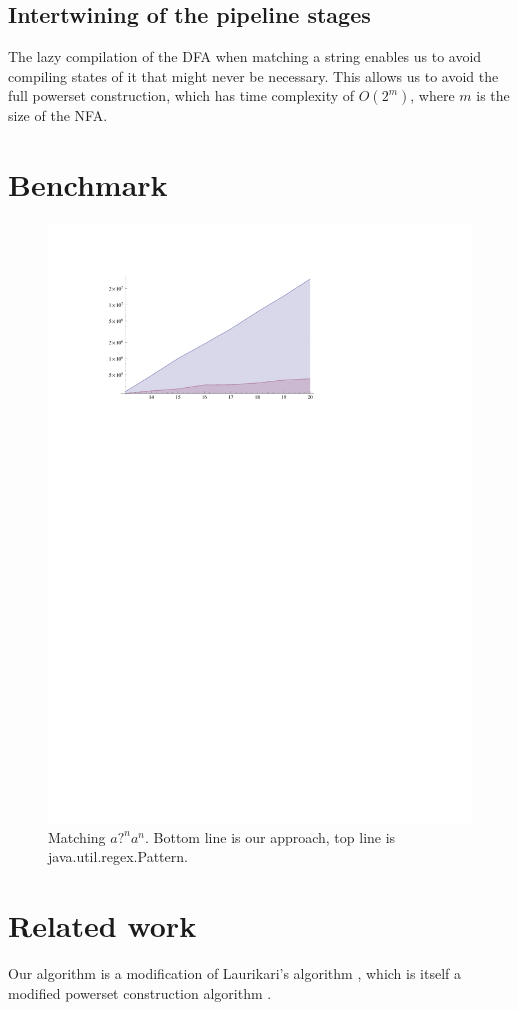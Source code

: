 \documentclass[english]{sigplanconf}
\theoremstyle{definition}
\begin{document}
\subsection{Intertwining of the pipeline stages}
The lazy compilation of the DFA when matching a string enables us
to avoid compiling states of it that might never be necessary. This
allows us to avoid the full powerset construction\cite{Sips05a}, which has 
time complexity of $O(2^m)$, where $m$ is the size of the NFA.

\section{Benchmark}
\begin{figure}[h]
\includegraphics[width=0.75\linewidth]{graphs/pathological}
\caption{ Matching $\textit{a?}^n\textit{a}^n$. Bottom line is our approach, top line is java.util.regex.Pattern.}
\end{figure}

\section{Related work}
Our algorithm is a modification of Laurikari's algorithm \cite{laurikari2000nfas},
which is itself a modified powerset construction algorithm \cite[p. 55]{Sipser2005}.
\end{document}

